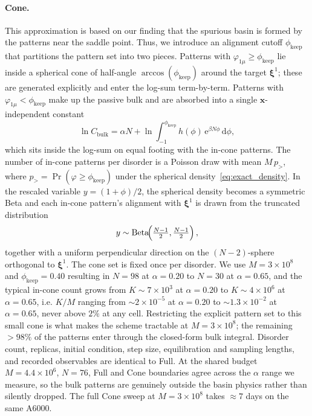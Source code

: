 \documentclass[letterpaper]{article} %
\newcommand{\bxi}{\boldsymbol{\xi}}
\newcommand{\bx}{\bm{x}}
\newcommand{\e}{{\mathrm{e}}}
\newcommand{\dd}{{\mathrm{d}}}
\newcommand{\Bnet}{\beta}
\begin{document}
\paragraph{Cone.}
This approximation is based on our finding that the spurious basin is formed
by the patterns near the saddle point. Thus, we introduce an alignment cutoff $\phi_{\mathrm{keep}}$ 
that partitions the pattern set into two pieces. Patterns with $\varphi_{1\mu} \geq \phi_{\mathrm{keep}}$
lie inside a spherical cone of half-angle $\arccos(\phi_{\mathrm{keep}})$
around the target $\bxi^1$; these are generated explicitly and enter the
log-sum term-by-term.  Patterns with $\varphi_{1\mu} < \phi_{\mathrm{keep}}$
make up the passive bulk and are absorbed into a single
$\bx$-independent constant
\begin{equation}
\ln C_{\mathrm{bulk}} = \alpha N + \ln \!\int_{-1}^{\phi_{\mathrm{keep}}}
 h(\phi)\,\e^{\Bnet N \phi}\,\dd\phi,
\label{eq:cbulk}
\end{equation}
which sits inside the log-sum on equal footing with the in-cone patterns.
The number of in-cone patterns per disorder is a Poisson draw with mean
$M\,p_{>}$, where $p_{>} = \Pr(\varphi \geq \phi_{\mathrm{keep}})$ under
the spherical density~\eqref{eq:exact_density}.  In the rescaled variable
$y = (1 + \phi)/2$, the spherical density becomes a symmetric Beta and
each in-cone pattern's alignment with $\bxi^1$ is drawn from the truncated
distribution
\begin{equation}
    y \sim \mathrm{Beta}\!\Bigl(\tfrac{N-1}{2}, \tfrac{N-1}{2}\Bigr)\,,
\label{eq:beta-tail}
\end{equation}
together with a uniform perpendicular direction on the $(N{-}2)$-sphere
orthogonal to $\bxi^1$.  The cone set is fixed once per disorder.  We
use $M = 3 \times 10^8$ and $\phi_{\mathrm{keep}} = 0.40$ resulting in $N = 98$ at
$\alpha = 0.20$ to $N = 30$ at $\alpha = 0.65$, and the typical in-cone
count grows from $K \sim 7 \times 10^3$ at $\alpha = 0.20$ to
$K \sim 4 \times 10^6$ at $\alpha = 0.65$, i.e. $K/M$ ranging from
$\sim 2\times 10^{-5}$ at $\alpha = 0.20$ to $\sim 1.3\times 10^{-2}$ at
$\alpha = 0.65$, never above $2\%$ at any cell.  Restricting the explicit
pattern set to this small cone is what makes the scheme tractable at
$M = 3 \times 10^8$; the remaining $> 98\%$ of the patterns enter
through the closed-form bulk integral.  Disorder count, replicas, initial
condition, step size, equilibration and sampling lengths, and recorded
observables are identical to Full.  At the shared budget
$M = 4.4 \times 10^6$, $N = 76$, Full and Cone boundaries agree across
the $\alpha$ range we measure, so the bulk patterns are genuinely outside
the basin physics rather than silently dropped.  The full Cone sweep at
$M = 3 \times 10^8$ takes $\approx 7$ days on the same A6000.
\end{document}
